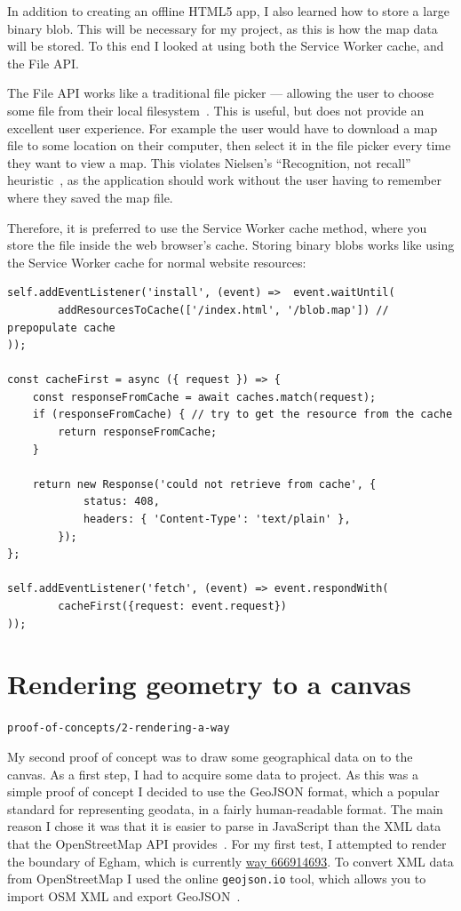 \documentclass[]{final_report}
\begin{document}
In addition to creating an offline HTML5 app, I also learned how to store a large binary blob. This will be necessary for my project, as this is how the map data will be stored. To this end I looked at using both the Service Worker cache, and the File API\@.

The File API works like a traditional file picker --- allowing the user to choose some file from their local filesystem~\cite{w3c-file-api}. This is useful, but does not provide an excellent user experience. For example the user would have to download a map file to some location on their computer, then select it in the file picker every time they want to view a map. This violates Nielsen's ``Recognition, not recall'' heuristic~\cite{nielsen-heuristics}, as the application should work without the user having to remember where they saved the map file.

Therefore, it is preferred to use the Service Worker cache method, where you store the file inside the web browser's cache. Storing binary blobs works like using the Service Worker cache for normal website resources:

\begin{lstlisting}[caption=Using the Service Worker cache]
self.addEventListener('install', (event) =>  event.waitUntil(
        addResourcesToCache(['/index.html', '/blob.map']) // prepopulate cache
));

const cacheFirst = async ({ request }) => {
    const responseFromCache = await caches.match(request);
    if (responseFromCache) { // try to get the resource from the cache
        return responseFromCache;
    }

    return new Response('could not retrieve from cache', {
            status: 408,
            headers: { 'Content-Type': 'text/plain' },
        });
};

self.addEventListener('fetch', (event) => event.respondWith(
        cacheFirst({request: event.request})
));
\end{lstlisting}

\section{Rendering geometry to a canvas}

\hfill \texttt{proof-of-concepts/2-rendering-a-way}

My second proof of concept was to draw some geographical data on to the canvas. As a first step, I had to acquire some data to project. As this was a simple proof of concept I decided to use the GeoJSON format, which a popular standard for representing geodata, in a fairly human-readable format. The main reason I chose it was that it is easier to parse in JavaScript than the XML data that the OpenStreetMap API provides~\cite{osm-api-wiki}. For my first test, I attempted to render the boundary of Egham, which is currently \href{https://www.openstreetmap.org/way/666914693}{way 666914693}. To convert XML data from OpenStreetMap I used the online \texttt{geojson.io} tool, which allows you to import OSM XML and export GeoJSON~\cite{geojson.io}.
\end{document}

